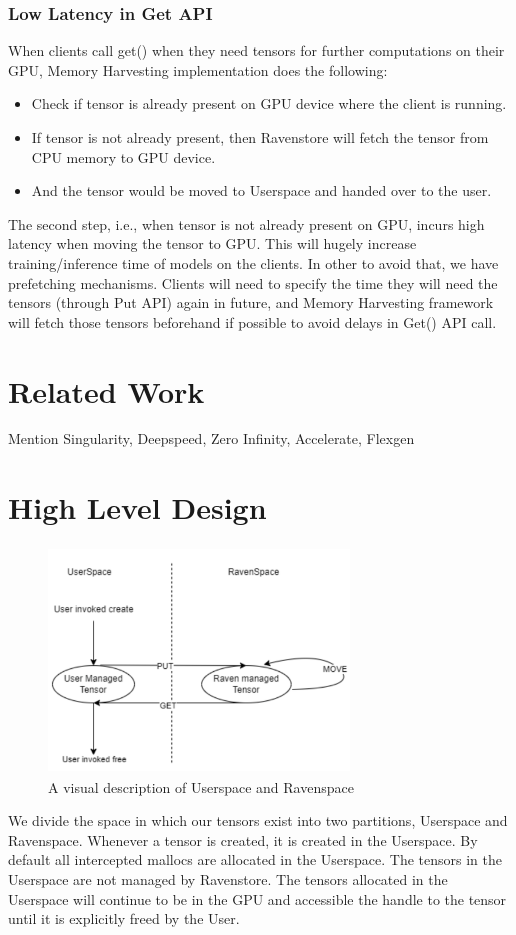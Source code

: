 \documentclass{article}
\begin{document}
	\subsubsection{Low Latency in Get API} When clients call get() when they need tensors for further computations on their GPU, Memory Harvesting implementation does the following:
	\begin{itemize}
		\item Check if tensor is already present on GPU device where the client is running.
		\item If tensor is not already present, then Ravenstore will fetch the tensor from CPU memory to GPU device.
		\item And the tensor would be moved to Userspace and handed over to the user.
	\end{itemize}
	The second step, i.e., when tensor is not already present on GPU, incurs high latency when moving the tensor to GPU.
	This will hugely increase training/inference time of models on the clients. In other to avoid that, we have prefetching mechanisms.
	Clients will need to specify the time they will need the tensors (through Put API) again in future, and Memory Harvesting framework will
	fetch those tensors beforehand if possible to avoid delays in Get() API call.

\section{Related Work}
\cite[][]{shuklasingularity}

Mention Singularity, Deepspeed, Zero Infinity, Accelerate, Flexgen

\section{High Level Design}
\begin{figure}[!htbp]
	\centering
	\includegraphics[height=6cm, width=8cm]{figures/ravenspace.png}
	\caption{A visual description of Userspace and Ravenspace}
\end{figure}
We divide the space in which our tensors exist into two partitions, Userspace and Ravenspace.
Whenever a tensor is created, it is created in the Userspace. By default all intercepted mallocs 
are allocated in the Userspace. The tensors in the Userspace are not managed by Ravenstore. 
The tensors allocated in the Userspace will continue to be in the GPU and accessible the handle to 
the tensor until it is explicitly freed by the User.
\end{document}
